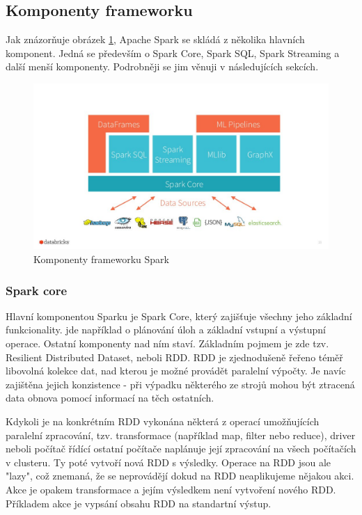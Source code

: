 \documentclass[thesis=B,czech]{FITthesis}[2012/06/26]
\begin{document}
\subsection{Komponenty frameworku}
	Jak znázorňuje obrázek \ref{fig:spark_components}, Apache Spark se skládá z několika hlavních komponent. Jedná se především o Spark Core, Spark SQL, Spark Streaming a další menší komponenty. Podrobněji se jim věnuji v následujících sekcích. 
	\begin{figure}[ht]
    	\centering
    	\includegraphics[width=1\textwidth]{images/spark_engine.jpg}
    	\caption{Komponenty frameworku Spark\cite{spark-components}}
    	\label{fig:spark_components}
	\end{figure}
	
\subsubsection{Spark core}
\label{spark-core}
	Hlavní komponentou Sparku je Spark Core, který zajišťuje všechny jeho základní funkcionality. jde například o plánování úloh a základní vstupní a výstupní operace. Ostatní komponenty nad ním staví. Základním pojmem je zde tzv. Resilient Distributed Dataset, neboli RDD. RDD je zjednodušeně řeřeno téměř libovolná kolekce dat, nad kterou je možné provádět paralelní výpočty. Je navíc zajištěna jejich konzistence - při výpadku některého ze strojů mohou být ztracená data obnova pomocí informací na těch ostatních. 
	
	Kdykoli je na konkrétním RDD vykonána některá z operací umožňujících paralelní zpracování, tzv. transformace (například map, filter nebo reduce), driver neboli počítač řídící ostatní počítače naplánuje její zpracování na všech počítačích v clusteru. Ty poté vytvoří nová RDD s výsledky. Operace na RDD jsou ale "lazy", což znemaná, že se neprovádějí dokud na RDD neaplikujeme nějakou akci. Akce je opakem transformace a jejím výsledkem není vytvoření nového RDD. Příkladem akce je vypsání obsahu RDD na standartní výstup. 
\end{document}
